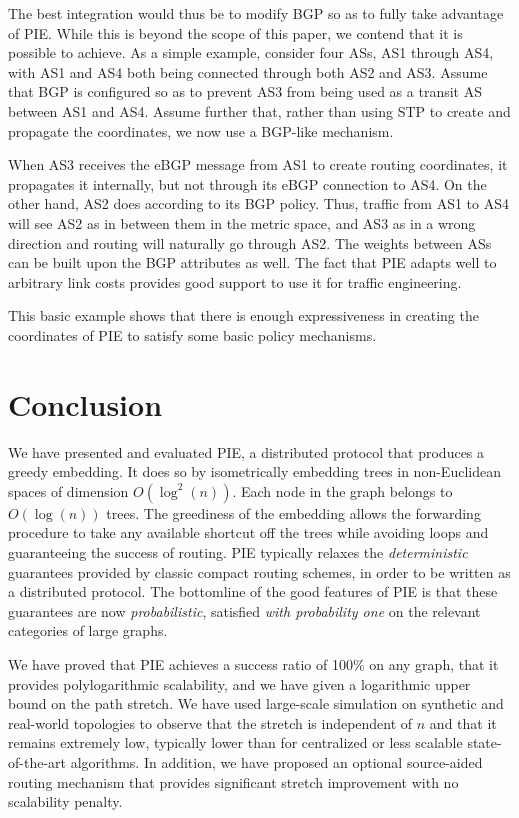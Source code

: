 \documentclass[conference]{IEEEtran}
\begin{document}
The best integration would thus be to modify BGP so as to fully take
advantage of PIE. While this is beyond the scope of this paper, we
contend that it is possible to achieve. As a simple example, consider four
ASs, AS1 through AS4, with AS1 and AS4 both being connected through
both AS2 and AS3. Assume that BGP is configured so as to prevent AS3
from being used as a transit AS between AS1 and AS4. Assume further
that, rather than using STP to create and propagate the coordinates,
we now use a BGP-like mechanism.

When AS3 receives the eBGP message from AS1 to create routing
coordinates, it propagates it internally, but not through its eBGP
connection to AS4. On the other hand, AS2 does according to its BGP
policy. Thus, traffic from AS1 to AS4 will see AS2 as in between them in the metric space,
and AS3 as in a wrong direction and routing will naturally go through
AS2. The weights between ASs can be built upon the BGP attributes
as well.
The fact that PIE adapts well to arbitrary link costs
provides good support to use it for traffic engineering.

This basic example shows that there is enough expressiveness in
creating the coordinates of PIE to satisfy some basic policy
mechanisms.

\section{Conclusion}
\label{sec:conclusion}


We have presented and evaluated PIE, a distributed protocol that produces a greedy embedding. It does so by isometrically embedding trees in non-Euclidean spaces of dimension $O(\log^2(n))$. Each node in the graph belongs to $O(\log(n))$ trees.
The greediness of the embedding allows the forwarding procedure to take any available shortcut off the trees while avoiding loops and guaranteeing the success of routing.
PIE typically relaxes the \emph{deterministic} guarantees provided by classic compact routing schemes, in order to be written as a distributed protocol. The bottomline of the good features of PIE is that these guarantees are now \emph{probabilistic}, satisfied \emph{with probability one} on the relevant categories of large graphs.


We have proved that PIE achieves a success ratio of 100\% on any graph, that it provides polylogarithmic scalability, and we have given a logarithmic upper bound on the path stretch. We have used large-scale simulation on synthetic and real-world topologies to observe that the stretch is independent of $n$ and that it remains extremely low, typically lower than for centralized or less scalable state-of-the-art algorithms. In addition, we have proposed an optional source-aided routing mechanism that provides significant stretch improvement with no scalability penalty.
\end{document}
